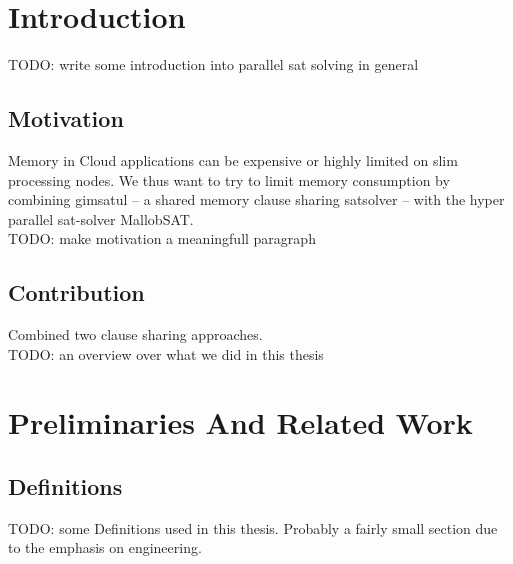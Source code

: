 \documentclass[12pt,a4paper,twoside]{scrartcl}
\numberwithin{equation}{section}
\begin{document}
\tableofcontents

\clearpage


\listoffigures
\listoftables

\clearpage


\section{Introduction}

TODO: write some introduction into parallel sat solving in general

\subsection{Motivation}

Memory in Cloud applications can be expensive or highly limited on slim processing nodes. We thus want to try to limit memory consumption by combining gimsatul -- a shared memory clause sharing satsolver -- with the hyper parallel sat-solver MallobSAT.\\

TODO: make motivation a meaningfull paragraph

\subsection{Contribution}

Combined two clause sharing approaches.\\

TODO: an overview over what we did in this thesis



\section{Preliminaries And Related Work}

\subsection{Definitions}

TODO: some Definitions used in this thesis. Probably a fairly small section due to the emphasis on engineering.
\end{document}
